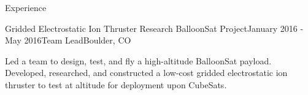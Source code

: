 \documentclass{resume} %
\begin{document}
\begin{rSection}{Experience}
\begin{rSubsection}{Gridded Electrostatic Ion Thruster Research BalloonSat Project}{January 2016 - May 2016}{Team Lead}{Boulder, CO}
\item {\small Led a team to design, test, and fly a high-altitude BalloonSat payload. Developed, researched, and constructed a low-cost gridded electrostatic ion thruster to test at altitude for deployment upon CubeSats.}
\end{rSubsection}






\end{rSection}
\end{document}
